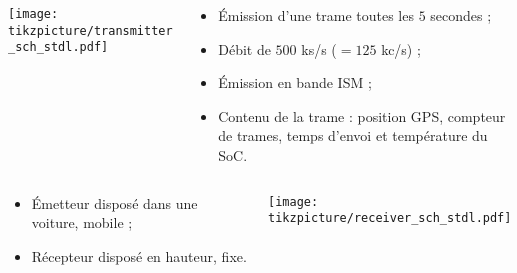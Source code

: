 \documentclass[../main.tex]{subfiles}
\begin{document}
\begin{frame}{\subsecname}
  \begin{columns}
    \begin{column}{.5\linewidth}
      \texttt{[image: tikzpicture/transmitter\_sch\_stdl.pdf]}
    \end{column}
    \begin{column}{.5\linewidth}
      \begin{overlayarea}{\linewidth}{.55\textheight}
        \begin{itemize}
          \item Émission d'une trame toutes les $5$ secondes ;
          \item Débit de $500$ ks/s ($= 125$ kc/s) ;
          \item Émission en bande ISM ;
          \item Contenu de la trame : position GPS, compteur de trames, temps d'envoi et température du SoC.
        \end{itemize}
      \end{overlayarea}
    \end{column}
  \end{columns}

  \begin{columns}
    \begin{column}{.3\linewidth}
      \begin{itemize}
        \item Émetteur disposé dans une voiture, mobile ;
        \item Récepteur disposé en hauteur, fixe.
      \end{itemize}
    \end{column}
    \begin{column}{.7\linewidth}
      \texttt{[image: tikzpicture/receiver\_sch\_stdl.pdf]}
    \end{column}
  \end{columns}
\end{frame}
\end{document}
